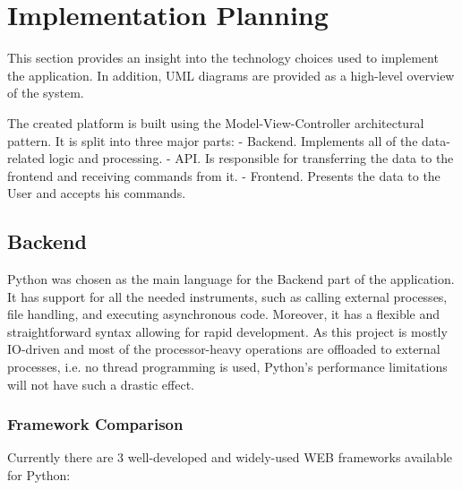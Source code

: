 \chapter{Implementation Planning}
This section provides an insight into the technology choices used to implement the application.
In addition, UML diagrams are provided as a high-level overview of the system.

The created platform is built using the Model-View-Controller\cite{11} architectural pattern.
It is split into three major parts:
- Backend. Implements all of the data-related logic and processing.
- API. Is responsible for transferring the data to the frontend and receiving commands from it.
- Frontend. Presents the data to the User and accepts his commands.


\section{Backend}
Python was chosen as the main language for the Backend part of the application.
It has support for all the needed instruments, such as calling external processes,
file handling, and executing asynchronous code. Moreover, it has a flexible and straightforward
syntax allowing for rapid development.
As this project is mostly IO-driven and most of the processor-heavy operations are offloaded to external processes,
i.e. no thread programming is used, Python's performance limitations\cite{12} will not have such a drastic effect.

\subsection{Framework Comparison}

Currently there are 3 well-developed and widely-used WEB frameworks available for Python:

